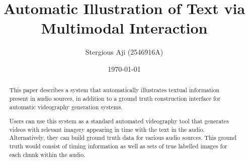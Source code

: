 \documentclass{l4proj}
\begin{document}
\title{Automatic Illustration of Text via Multimodal Interaction}
\author{Stergious Aji (2546916A)}
\date{\today}

\maketitle

\begin{abstract}
    This paper describes a system that automatically illustrates textual information present in audio sources, in addition to a ground truth construction interface for automatic videography generation systems.
    
    Users can use this system as a standard automated videography tool that generates videos with relevant imagery appearing in time with the text in the audio. Alternatively, they can build ground truth data for various audio sources. This ground truth would consist of timing information as well as sets of true labelled images for each chunk within the audio.

    
    
\end{abstract}

%

%
\end{document}

